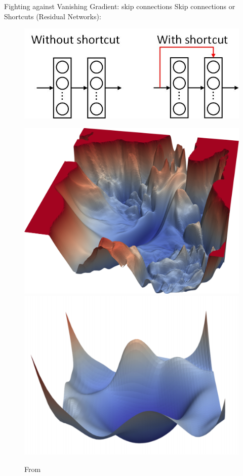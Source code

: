 \documentclass[handout,xcolor=pdftex,dvipsnames,table,mathserif]{beamer}
\begin{document}
\begin{frame}{Fighting against Vanishing Gradient: skip connections}
Skip connections or Shortcuts (Residual Networks): 
\begin{figure}
\includegraphics[width=.65 \columnwidth]{../graphics/shortcut}
\end{figure}
\begin{figure}
\includegraphics[width=.4\columnwidth]{../graphics/VGG56Loss}
\includegraphics[width=.45\columnwidth]{../graphics/Resnet56}
\caption{From \cite{li2017visualizing}}
\end{figure}
\end{frame}

\end{document}
